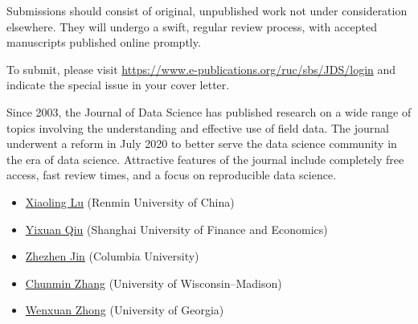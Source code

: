 \documentclass[12pt]{article}
\begin{document}
Submissions should consist of original, unpublished work not under
consideration elsewhere. They will undergo a swift, regular review
process, with accepted manuscripts published online promptly.



To submit, please visit
\url{https://www.e-publications.org/ruc/sbs/JDS/login} and indicate
the special issue in your cover letter.


Since 2003, the Journal of Data Science has published research on a
wide range of topics involving the understanding and effective use of
field data. The journal underwent a reform in July 2020 to better serve
the data science community in the era of data science. Attractive
features of the journal include completely free access, fast review
times, and a focus on reproducible data science.


\bigskip
{}
\begin{itemize}[leftmargin=2ex, topsep=2pt,itemsep=2pt,partopsep=0pt, parsep=0pt]
\item
\href{http://stat.ruc.edu.cn/jxtd/jsdw/sjkxydsjtjx/5b900093966a43e0ab69dfbaf82e095a.htm}{Xiaoling Lu} (Renmin University of China)

\item
\href{https://statr.me/about/}
{Yixuan Qiu} (Shanghai University of Finance and Economics)

\item
\href{https://www.columbia.edu/~zj7/}
{Zhezhen Jin} (Columbia University)

\item
\href{https://pages.stat.wisc.edu/~cmzhang/}
{Chunmin Zhang} (University of Wisconsin–Madison)

\item
\href{http://faculty.franklin.uga.edu/wenxuan/}
{Wenxuan Zhong} (University of Georgia)
\end{itemize}
\end{document}
